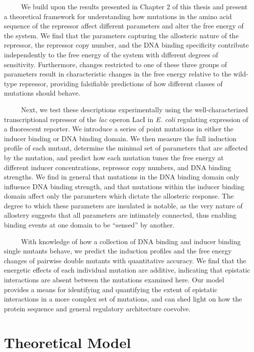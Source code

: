 \documentclass[12pt]{caltech_thesis}
\begin{document}
~~~~~We build upon the results presented in Chapter 2 of this thesis and
present a theoretical framework for understanding how mutations in the
amino acid sequence of the repressor affect different parameters and
alter the free energy of the system. We find that the parameters
capturing the allosteric nature of the repressor, the repressor copy
number, and the DNA binding specificity contribute independently to the
free energy of the system with different degrees of sensitivity.
Furthermore, changes restricted to one of these three groups of
parameters result in characteristic changes in the free energy relative
to the wild-type repressor, providing falsifiable predictions of how
different classes of mutations should behave.

~~~~~Next, we test these descriptions experimentally using the
well-characterized transcriptional repressor of the \emph{lac} operon
LacI in \emph{E. coli} regulating expression of a fluorescent reporter.
We introduce a series of point mutations in either the inducer binding
or DNA binding domain. We then measure the full induction profile of
each mutant, determine the minimal set of parameters that are affected
by the mutation, and predict how each mutation tunes the free energy at
different inducer concentrations, repressor copy numbers, and DNA
binding strengths. We find in general that mutations in the DNA binding
domain only influence DNA binding strength, and that mutations within
the inducer binding domain affect only the parameters which dictate the
allosteric response. The degree to which these parameters are insulated
is notable, as the very nature of allostery suggests that all parameters
are intimately connected, thus enabling binding events at one domain to
be ``sensed'' by another.

~~~~~With knowledge of how a collection of DNA binding and inducer
binding single mutants behave, we predict the induction profiles and the
free energy changes of pairwise double mutants with quantitative
accuracy. We find that the energetic effects of each individual mutation
are additive, indicating that epistatic interactions are absent between
the mutations examined here. Our model provides a means for identifying
and quantifying the extent of epistatic interactions in a more complex
set of mutations, and can shed light on how the protein sequence and
general regulatory architecture coevolve.

\hypertarget{theoretical-model-1}{%
\section{Theoretical Model}\label{theoretical-model-1}}
\end{document}
